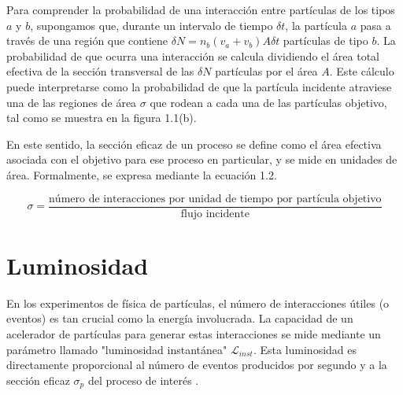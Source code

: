 Para comprender la probabilidad de una interacción entre partículas de los tipos $a$ y $b$, supongamos que, durante un intervalo de tiempo $\delta t$, la partícula $a$ pasa a través de una región que contiene  $\delta N= n_{b}(v_{a}+v_{b}) A \delta t$ partículas de tipo $b$. La probabilidad de que ocurra una interacción se calcula dividiendo el área total efectiva de la sección transversal de las $\delta N$ partículas por el área $A$. Este cálculo puede interpretarse como la probabilidad de que la partícula incidente atraviese una de las regiones de área $\sigma$ que rodean a cada una de las partículas objetivo, tal como se muestra en la figura 1.1(b).

En este sentido, la sección eficaz de un proceso se define como el área efectiva asociada con el objetivo para ese proceso en particular, y se mide en unidades de área. Formalmente, se expresa mediante la ecuación 1.2.

\begin{equation}
\sigma=\frac{\text{número de interacciones por unidad de tiempo por partícula objetivo}}{\text{flujo incidente}}
\label{cross}
\end{equation}





\section{Luminosidad }

En los experimentos de física de partículas, el número de interacciones útiles (o eventos) es tan crucial como la energía involucrada. La capacidad de un acelerador de partículas para generar estas interacciones se mide mediante un parámetro llamado "luminosidad instantánea" \( \mathcal{L}_{inst} \). Esta luminosidad es directamente proporcional al número de eventos producidos por segundo y a la sección eficaz \( \sigma_p \) del proceso de interés \cite{concept_of_luminosity}.

